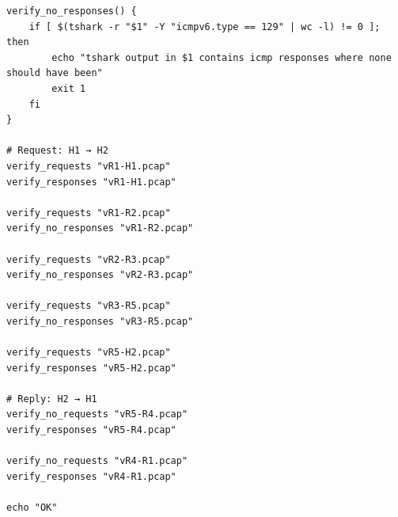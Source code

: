 \documentclass{article}
\begin{document}
\begin{verbatim}
verify_no_responses() {
    if [ $(tshark -r "$1" -Y "icmpv6.type == 129" | wc -l) != 0 ]; then
        echo "tshark output in $1 contains icmp responses where none should have been"
        exit 1
    fi
}

# Request: H1 → H2
verify_requests "vR1-H1.pcap"
verify_responses "vR1-H1.pcap"

verify_requests "vR1-R2.pcap"
verify_no_responses "vR1-R2.pcap"

verify_requests "vR2-R3.pcap"
verify_no_responses "vR2-R3.pcap"

verify_requests "vR3-R5.pcap"
verify_no_responses "vR3-R5.pcap"

verify_requests "vR5-H2.pcap"
verify_responses "vR5-H2.pcap"

# Reply: H2 → H1
verify_no_requests "vR5-R4.pcap"
verify_responses "vR5-R4.pcap"

verify_no_requests "vR4-R1.pcap"
verify_responses "vR4-R1.pcap"

echo "OK"


\end{verbatim}
\end{document}
